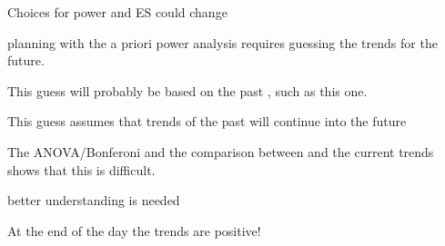 \begin{itemize}
\begin{itemize}
	\end{itemize}
	\item Choices for power and ES could change
	\item planning with the a priori power analysis requires guessing the trends for the future.  %
	\item This guess will probably be based on the past , such as this one.
	\item This guess assumes that trends of the past will continue into the future
	\item The ANOVA/Bonferoni and the comparison between \citep{robinson2008ph} and the current trends shows that this is difficult.
	\item better understanding is needed
	\item At the end of the day the trends are positive!

